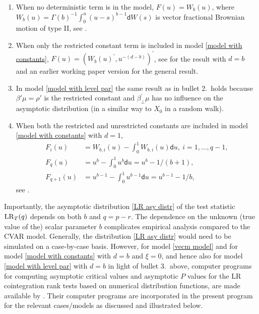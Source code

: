 \documentclass[10pt]{article}
\def\lrt{{\rm LR}_T}
\begin{document}
 \begin{enumerate}
 \item When no deterministic term is in the model, $F(u)=W_{b}(u)$, where $W_{b}(u)=\Gamma(b)^{-1}\int_{0}^{u}(u-s)^{b-1}\mathsf{d}W(s)$ is vector fractional Brownian motion of type II, see \citet[Theorem 11(i)]{johansen2012likelihood}.
 \item When only the restricted constant term is included in model \eqref{model with constants}, $F(u)=(W_{b}(u)^{\prime},u^{-(d-b)})^{\prime }$, see \citet[Theorem 11(iv)]{johansen2012likelihood} for the result with $d=b$ and an earlier working paper version for the general result.
\item In model \eqref{model with level par} the same result as in bullet 2.\ holds because $\beta'\mu = \rho'$ is the restricted constant and $\beta_\perp^{\prime} \mu$ has no influence on the asymptotic distribution (in a similar way to $X_0$ in a random walk).
 \item When both the restricted and unrestricted constants are included in model \eqref{model with constants} with $d=1$,
\begin{align*}
F_{i}(u) &= W_{b,i}(u) - \int_{0}^{1} W_{b,i}(u) \mathsf{d} u, \ i=1,...,q-1, \\
F_{q}(u) &= u^{b} - \int_{0}^{1}u^{b} \mathsf{d} u=u^{b}-1/(b+1), \\
F_{q+1}(u) &= u^{b-1} - \int_{0}^{1}u^{b-1} \mathsf{d} u = u^{b-1}-1/b, 
\end{align*}
see \cite{Dolatabadi2014}.
\end{enumerate}

Importantly, the asymptotic distribution \eqref{LR asy distr} of the test statistic $\lrt(q)$ depends on both $b$ and $q=p-r$. The dependence on the unknown (true value of the) scalar parameter $b$ complicates empirical analysis compared to the CVAR model. Generally, the distribution \eqref{LR asy distr} would need to be simulated on a case-by-case basis. However, for model \eqref{vecm model} and for model \eqref{model with constants} with $d=b$ and $\xi=0$, and hence also for model \eqref{model with level par} with $d=b$ in light of bullet 3.\ above, computer programs for computing asymptotic critical values and asymptotic $P$ values for the LR cointegration rank tests based on numerical distribution functions, are made available by \cite{mackinnon2014numerical}. Their computer programs are incorporated in the present program for the relevant cases/models as discussed and illustrated below.
\end{document}

